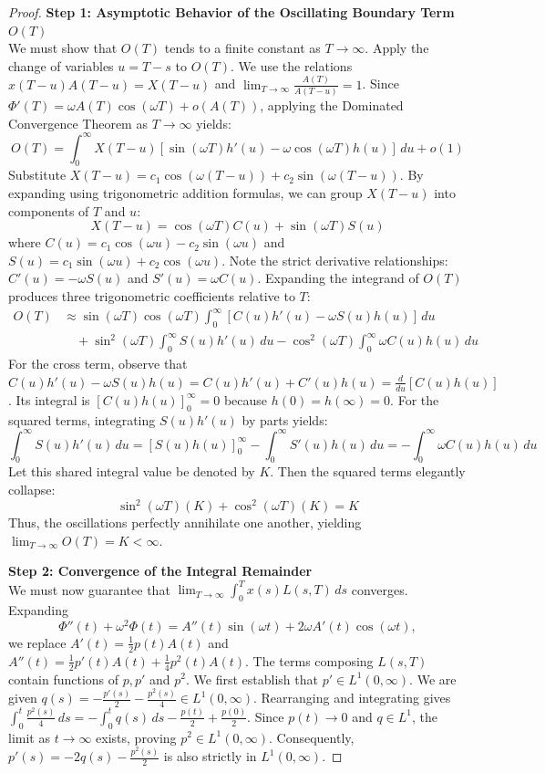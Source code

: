 \documentclass[10pt,reqno]{amsart}
\theoremstyle{definition}
\begin{document}
\begin{proof}
		\textbf{Step 1: Asymptotic Behavior of the Oscillating Boundary Term $O(T)$} \\
		We must show that $O(T)$ tends to a finite constant as $T \to \infty$. Apply the change of variables $u = T-s$ to $O(T)$. We use the relations $x(T-u)A(T-u) = X(T-u)$ and $\lim_{T \to \infty} \frac{A(T)}{A(T-u)} = 1$. Since $\Phi'(T) = \omega A(T)\cos(\omega T) + o(A(T))$, applying the Dominated Convergence Theorem as $T \to \infty$ yields:
		\[ O(T) = \int_0^\infty X(T-u) [ \sin(\omega T)h'(u) - \omega \cos(\omega T)h(u) ]\,du + o(1) \]
		Substitute $X(T-u) = c_1 \cos(\omega(T-u)) + c_2 \sin(\omega(T-u))$. By expanding using trigonometric addition formulas, we can group $X(T-u)$ into components of $T$ and $u$:
		\[ X(T-u) = \cos(\omega T) C(u) + \sin(\omega T) S(u) \]
		where $C(u) = c_1\cos(\omega u) - c_2\sin(\omega u)$ and $S(u) = c_1\sin(\omega u) + c_2\cos(\omega u)$. Note the strict derivative relationships: $C'(u) = -\omega S(u)$ and $S'(u) = \omega C(u)$. Expanding the integrand of $O(T)$ produces three trigonometric coefficients relative to $T$:
		\begin{align*}
			O(T) &\approx \sin(\omega T)\cos(\omega T) \int_0^\infty [ C(u)h'(u) - \omega S(u)h(u) ]\,du \\
			&\quad + \sin^2(\omega T) \int_0^\infty S(u)h'(u)\,du - \cos^2(\omega T) \int_0^\infty \omega C(u)h(u)\,du
		\end{align*}
		For the cross term, observe that $C(u)h'(u) - \omega S(u)h(u) = C(u)h'(u) + C'(u)h(u) = \frac{d}{du}[C(u)h(u)]$. Its integral is $[C(u)h(u)]_0^\infty = 0$ because $h(0) = h(\infty) = 0$.
		For the squared terms, integrating $S(u)h'(u)$ by parts yields:
		\[ \int_0^\infty S(u)h'(u)\,du = [S(u)h(u)]_0^\infty - \int_0^\infty S'(u)h(u)\,du = -\int_0^\infty \omega C(u)h(u)\,du \]
		Let this shared integral value be denoted by $K$. Then the squared terms elegantly collapse:
		\[ \sin^2(\omega T) (K) + \cos^2(\omega T) (K) = K \]
		Thus, the oscillations perfectly annihilate one another, yielding $\lim_{T \to \infty} O(T) = K < \infty$.
		
		\textbf{Step 2: Convergence of the Integral Remainder} \\
		We must now guarantee that $\lim_{T \to \infty} \int_0^T x(s) L(s,T)\,ds$ converges. Expanding $$\Phi''(t) + \omega^2 \Phi(t) = A''(t)\sin(\omega t) + 2\omega A'(t)\cos(\omega t),$$ we replace $A'(t) = \frac{1}{2}p(t)A(t)$ and $A''(t) = \frac{1}{2}p'(t)A(t) + \frac{1}{4}p^2(t)A(t)$.
		The terms composing $L(s,T)$ contain functions of $p, p'$ and $p^2$. We first establish that $p' \in L^1(0, \infty)$. We are given $q(s) = -\frac{p'(s)}{2} - \frac{p^2(s)}{4} \in L^1(0, \infty)$. Rearranging and integrating gives $\int_0^t \frac{p^2(s)}{4}\,ds = -\int_0^t q(s)\,ds - \frac{p(t)}{2} + \frac{p(0)}{2}$. Since $p(t) \to 0$ and $q \in L^1$, the limit as $t \to \infty$ exists, proving $p^2 \in L^1(0, \infty)$. Consequently, $p'(s) = -2q(s) - \frac{p^2(s)}{2}$ is also strictly in $L^1(0, \infty)$.
		

\end{proof}
\end{document}
